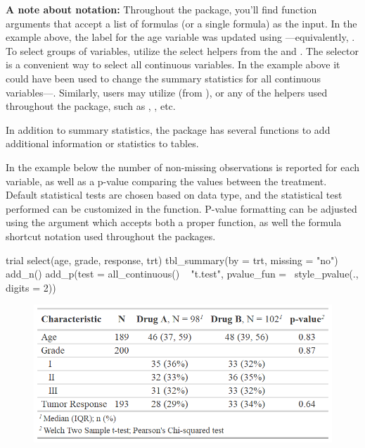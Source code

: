 \textbf{A note about notation:}
Throughout the  package, you'll find function arguments that accept a list of formulas (or a single formula) as the input.
In the example above, the label for the age variable was updated using ---equivalently, .
To select groups of variables, utilize the select helpers from the  and .
The  selector is a convenient way to select all continuous variables.
In the example above it could have been used to change the summary statistics for all continuous variables---. 
Similarly, users may utilize  (from ), or any of the  helpers used throughout the  package, such as , , etc.

In addition to summary statistics, the  package has several functions to add additional information or statistics to  tables.



In the example below the number of non-missing observations is reported for each variable, as well as a p-value comparing the values between the treatment.
Default statistical tests are chosen based on data type, and the statistical test performed can be customized in the  function.
P-value formatting can be adjusted using the  argument which accepts both a proper function, as well the formula shortcut notation used throughout the  packages.

\newpage
\begin{example}
trial %
  select(age, grade, response, trt) %
  tbl_summary(by = trt, missing = "no") %
  add_n() %
  add_p(test = all_continuous() ~ "t.test",
        pvalue_fun = ~style_pvalue(., digits = 2))

\end{example}
\begin{figure}[h!]
  \includegraphics[scale=0.49]{summary_plus_plus.png}
  \centering
\end{figure}

